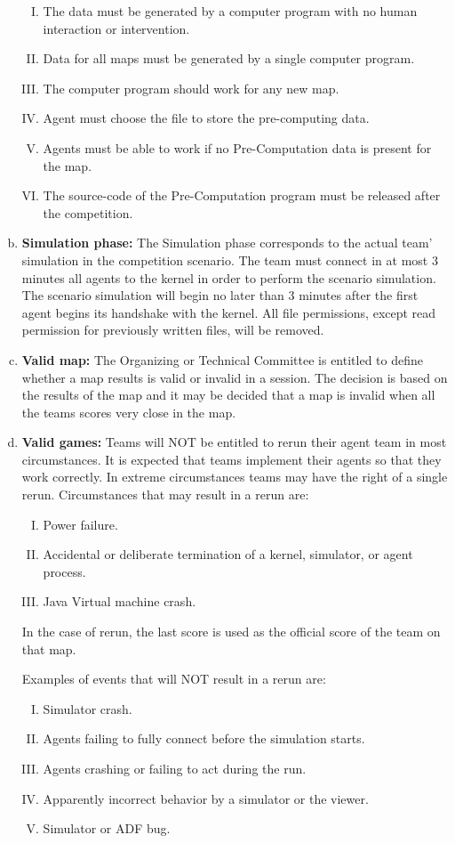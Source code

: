 \documentclass{article}
\begin{document}
\begin{enumerate}[(a)]
\begin{enumerate}[I.]
\item The data must be generated by a computer program with no human interaction or intervention.
\item Data for all maps must be generated by a single computer program.
\item The computer program should work for any new map.
\item Agent must choose the file to store the pre-computing data.
\item Agents must be able to work if no Pre-Computation data is present for
the map.
\item The source-code of the Pre-Computation program must be released after the competition.
\end{enumerate}
\item \textbf{Simulation phase:} The Simulation phase corresponds to the actual team' simulation in the competition scenario. The team must connect in at most 3 minutes all agents to the kernel in order to perform the scenario simulation. The scenario simulation will begin no later than 3 minutes after the first agent begins its handshake with the kernel. All file permissions, except read permission for previously written files, will be removed.\label{item:simphase}
\item \textbf{Valid map:} The Organizing or Technical Committee is entitled to define whether a map results is valid or invalid in a session. The decision is based on the results of the map and it may be decided that a map is invalid when all the teams scores very close in the map.
\item \textbf{Valid games:} Teams will NOT be entitled to rerun their agent team in most circumstances. It is expected that teams implement their agents so that they work correctly. In extreme circumstances teams may have the right of a single rerun. Circumstances that may result in a rerun are:
\begin{enumerate}[I.]
\item Power failure.
\item Accidental or deliberate termination of a kernel, simulator, or agent process.
\item Java Virtual machine crash.
\end{enumerate}
In the case of rerun, the last score is used as the official score of the team on that map.

Examples of events that will NOT result in a rerun are:
\begin{enumerate}[I.]
\item Simulator crash.
\item Agents failing to fully connect before the simulation starts.
\item Agents crashing or failing to act during the run.
\item Apparently incorrect behavior by a simulator or the viewer.
\item Simulator or ADF bug.
\end{enumerate}


\end{enumerate}
\end{document}
